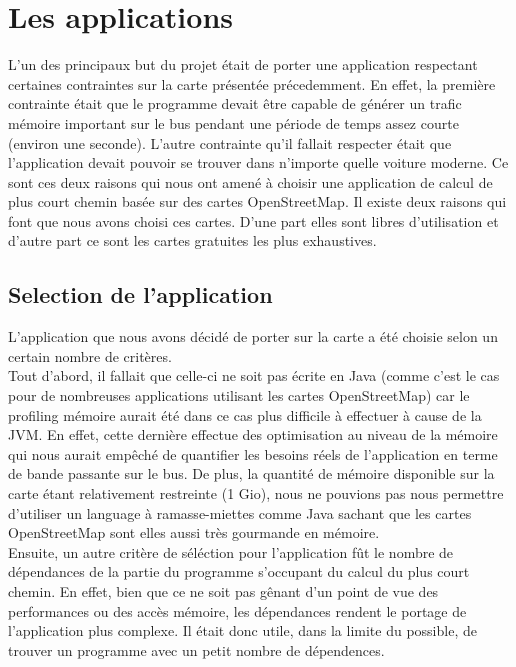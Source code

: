 \section{Les applications}

L'un des principaux but du projet était de porter une application respectant 
certaines contraintes sur la carte présentée précedemment. En effet, la 
première contrainte était que le programme devait être capable de générer un 
trafic mémoire important sur le bus pendant une période de temps assez courte 
(environ une seconde). L'autre contrainte qu'il fallait respecter était que 
l'application devait pouvoir se trouver dans n'importe quelle voiture moderne. 
Ce sont ces deux raisons qui nous ont amené à choisir une application de calcul 
de plus court chemin basée sur des cartes OpenStreetMap. Il existe deux raisons 
qui font que nous avons choisi ces cartes. D'une part elles sont libres 
d'utilisation et d'autre part ce sont les cartes gratuites les plus 
exhaustives. 

\subsection{Selection de l'application}

L'application que nous avons décidé de porter sur la carte a été choisie selon 
un certain nombre de critères. \\

Tout d'abord, il fallait que celle-ci ne soit pas écrite en Java (comme c'est 
le cas pour de nombreuses applications utilisant les cartes OpenStreetMap) car 
le profiling mémoire aurait été dans ce cas plus difficile à effectuer à cause 
de la JVM. En effet, cette dernière effectue des optimisation au niveau de la 
mémoire qui nous aurait empêché de quantifier les besoins réels de 
l'application en terme de bande passante sur le bus. De plus, la quantité de 
mémoire disponible sur la carte étant relativement restreinte (1 Gio), nous ne 
pouvions pas nous permettre d'utiliser un language à ramasse-miettes comme 
Java sachant que les cartes OpenStreetMap sont elles aussi très gourmande en 
mémoire. \\

Ensuite, un autre critère de séléction pour l'application fût le nombre de 
dépendances de la partie du programme s'occupant du calcul du plus court 
chemin. En effet, bien que ce ne soit pas gênant d'un point de vue des 
performances ou des accès mémoire, les dépendances rendent le portage de 
l'application plus complexe. Il était donc utile, dans la limite du possible, 
de trouver un programme avec un petit nombre de dépendences. \\

